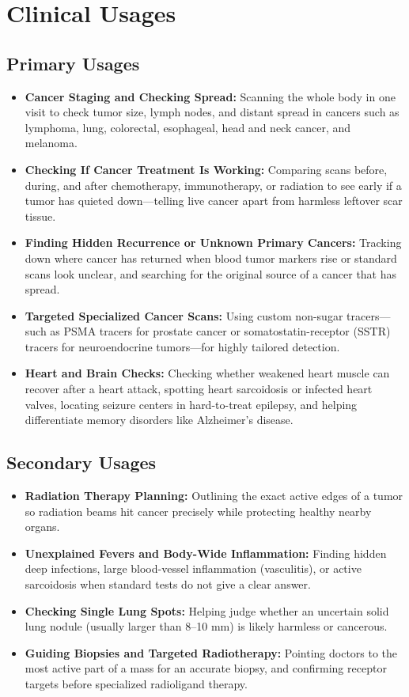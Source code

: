 \section{Clinical Usages}

\subsection{Primary Usages}

\begin{itemize}
    \item \textbf{Cancer Staging and Checking Spread:} Scanning the whole body in one visit to check tumor size, lymph nodes, and distant spread in cancers such as lymphoma, lung, colorectal, esophageal, head and neck cancer, and melanoma.
    \item \textbf{Checking If Cancer Treatment Is Working:} Comparing scans before, during, and after chemotherapy, immunotherapy, or radiation to see early if a tumor has quieted down---telling live cancer apart from harmless leftover scar tissue.
    \item \textbf{Finding Hidden Recurrence or Unknown Primary Cancers:} Tracking down where cancer has returned when blood tumor markers rise or standard scans look unclear, and searching for the original source of a cancer that has spread.
    \item \textbf{Targeted Specialized Cancer Scans:} Using custom non-sugar tracers---such as PSMA tracers for prostate cancer or somatostatin-receptor (SSTR) tracers for neuroendocrine tumors---for highly tailored detection.
    \item \textbf{Heart and Brain Checks:} Checking whether weakened heart muscle can recover after a heart attack, spotting heart sarcoidosis or infected heart valves, locating seizure centers in hard-to-treat epilepsy, and helping differentiate memory disorders like Alzheimer's disease.
\end{itemize}

\subsection{Secondary Usages}

\begin{itemize}
    \item \textbf{Radiation Therapy Planning:} Outlining the exact active edges of a tumor so radiation beams hit cancer precisely while protecting healthy nearby organs.
    \item \textbf{Unexplained Fevers and Body-Wide Inflammation:} Finding hidden deep infections, large blood-vessel inflammation (vasculitis), or active sarcoidosis when standard tests do not give a clear answer.
    \item \textbf{Checking Single Lung Spots:} Helping judge whether an uncertain solid lung nodule (usually larger than 8--10 mm) is likely harmless or cancerous.
    \item \textbf{Guiding Biopsies and Targeted Radiotherapy:} Pointing doctors to the most active part of a mass for an accurate biopsy, and confirming receptor targets before specialized radioligand therapy.
\end{itemize}

